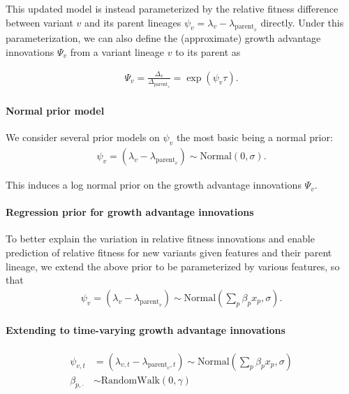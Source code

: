 \documentclass[12pt,oneside,letterpaper]{article}
\begin{document}
This updated model is instead parameterized by the relative fitness difference between variant $v$ and its parent lineages $\psi_{v} = \lambda_{v} - \lambda_{\text{parent}_{v}}$ directly.
Under this parameterization, we can also define the (approximate) growth advantage innovations $\Psi_{v}$ from a variant lineage $v$ to its parent as

\begin{align*}
\Psi_{v} = \frac{\Delta_{v}}{\Delta_{\text{parent}_{v}}} = \exp(\psi_{v} \tau).
\end{align*}

\paragraph{Normal prior model}%

We consider several prior models on $\psi_{v}$ the most basic being a normal prior:
\begin{align*}
    \psi_{v} = (\lambda_{v} - \lambda_{\text{parent}_{v}}) \sim \text{Normal}(0, \sigma).
\end{align*}

This induces a log normal prior on the growth advantage innovations $\Psi_{v}$.

\paragraph{Regression prior for growth advantage innovations}%

To better explain the variation in relative fitness innovations and enable prediction of relative fitness for new variants given features and their parent lineage, we extend the above prior to be parameterized by various features, so that
\begin{align*}
    \psi_{v} = (\lambda_{v} - \lambda_{\text{parent}_{v}}) \sim \text{Normal} \left( \sum_{p} \beta_{p} x_{p}, \sigma \right).
\end{align*}

\paragraph{Extending to time-varying growth advantage innovations}%

\begin{align*}
    \psi_{v,t} &= (\lambda_{v,t} - \lambda_{\text{parent}_{v}, t}) \sim \text{Normal} \left( \sum_{p} \beta_{p} x_{p}, \sigma \right) \\
    \beta_{p, \cdot} &\sim \text{RandomWalk}(0, \gamma)
\end{align*}
\end{document}
